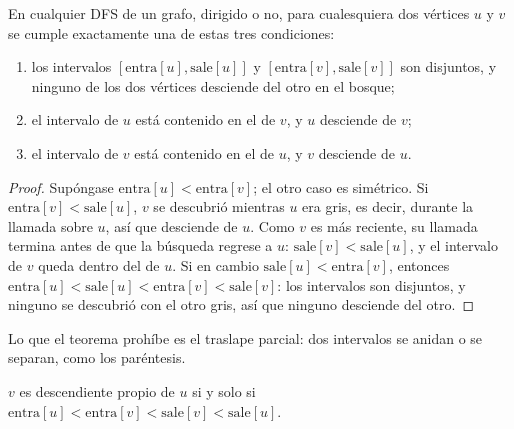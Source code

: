 \documentclass[11pt,letterpaper]{article}
\begin{document}
\begin{teorema}
  \label{teo:busq-parentesis}
  En cualquier DFS de un grafo, dirigido o no, para cualesquiera dos
  vértices $u$ y $v$ se cumple exactamente una de estas tres
  condiciones:
  \begin{enumerate}[itemsep=0.1em]
    \item los intervalos $[\text{entra}[u], \text{sale}[u]]$ y
      $[\text{entra}[v], \text{sale}[v]]$ son disjuntos, y ninguno de
      los dos vértices desciende del otro en el bosque;
    \item el intervalo de $u$ está contenido en el de $v$, y $u$
      desciende de $v$;
    \item el intervalo de $v$ está contenido en el de $u$, y $v$
      desciende de $u$.
  \end{enumerate}
\end{teorema}

\begin{proof}
  Supóngase $\text{entra}[u] < \text{entra}[v]$; el otro caso es
  simétrico. Si $\text{entra}[v] < \text{sale}[u]$, $v$ se descubrió
  mientras $u$ era gris, es decir, durante la llamada sobre $u$, así
  que desciende de $u$. Como $v$ es más reciente, su llamada termina
  antes de que la búsqueda regrese a $u$:
  $\text{sale}[v] < \text{sale}[u]$, y el intervalo de $v$ queda dentro
  del de $u$. Si en cambio $\text{sale}[u] < \text{entra}[v]$, entonces
  $\text{entra}[u] < \text{sale}[u] < \text{entra}[v] < \text{sale}[v]$:
  los intervalos son disjuntos, y ninguno se descubrió con el otro
  gris, así que ninguno desciende del otro.
\end{proof}

Lo que el teorema prohíbe es el traslape parcial: dos intervalos se
anidan o se separan, como los paréntesis.

\begin{corolario}
  \label{cor:busq-anidamiento}
  $v$ es descendiente propio de $u$ si y solo si
  $\text{entra}[u] < \text{entra}[v] < \text{sale}[v] < \text{sale}[u]$.
\end{corolario}
\end{document}
